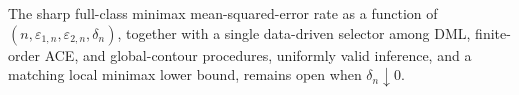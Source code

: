 The sharp full-class minimax mean-squared-error rate as a function of \((n,\varepsilon_{1,n},\varepsilon_{2,n},\delta_n)\), together with a single data-driven selector among DML, finite-order ACE, and global-contour procedures, uniformly valid inference, and a matching local minimax lower bound, remains open when \(\delta_n\downarrow0\).